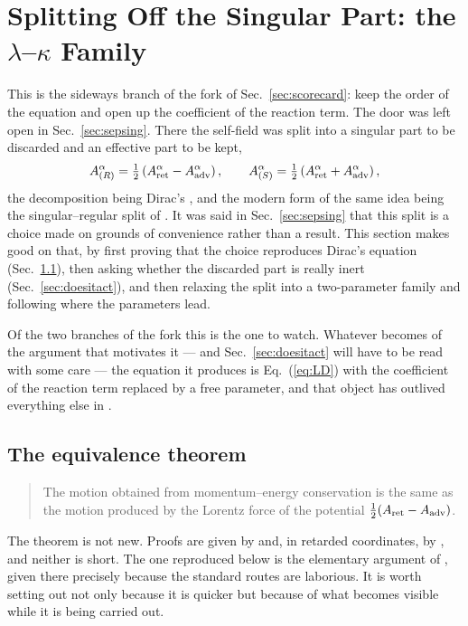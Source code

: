 \documentclass[preprint]{aastex701}
\newcommand{\Aret}{A^\alpha_{\rm ret}}
\newcommand{\Aadv}{A^\alpha_{\rm adv}}
\begin{document}
\section{Splitting Off the Singular Part: the $\lambda$--$\kappa$ Family}
\label{sec:lk}

This is the sideways branch of the fork of Sec.~\ref{sec:scorecard}: keep the
order of the equation and open up the coefficient of the reaction term. The
door was left open in Sec.~\ref{sec:sepsing}. There the self-field was split
into a singular part to be discarded and an effective part to be kept,
\begin{equation*}
A^\alpha_{(R)} = \tfrac12\left(\Aret - \Aadv\right),
\qquad
A^\alpha_{(S)} = \tfrac12\left(\Aret + \Aadv\right),
\end{equation*}
the decomposition being Dirac's \citep{dirac1938}, and the modern form of the
same idea being the singular--regular split of
\citet{detweiler_whiting2003}. It was said in Sec.~\ref{sec:sepsing} that this
split is a choice made on grounds of convenience rather than a result. This section makes good on that, by first
proving that the choice reproduces Dirac's equation
(Sec.~\ref{sec:equiv}), then asking whether the discarded part is really inert
(Sec.~\ref{sec:doesitact}), and then relaxing the split into a two-parameter
family and following where the parameters lead.

Of the two branches of the fork this is the one to watch. Whatever becomes of
the argument that motivates it --- and Sec.~\ref{sec:doesitact} will have to be
read with some care --- the equation it produces is Eq.~(\ref{eq:LD}) with the
coefficient of the reaction term replaced by a free parameter, and that object
has outlived everything else in \citet{zhang2006}.

\subsection{The equivalence theorem}
\label{sec:equiv}

\begin{quote}
The motion obtained from momentum--energy conservation is the same as the
motion produced by the Lorentz force of the potential
$\tfrac12(A_{\rm ret}-A_{\rm adv})$.
\end{quote}

The theorem is not new. Proofs are given by \citet{zhang_zongsui} and, in
retarded coordinates, by \citet{poisson2004}, and neither is short. The one
reproduced below is the elementary argument of \citet{zhang2006}, given there
precisely because the standard routes are laborious. It is worth setting out
not only because it is quicker but because of what becomes visible while it is
being carried out.
\end{document}
